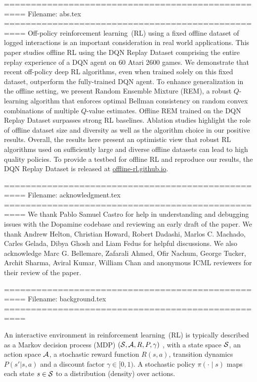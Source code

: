 
==================================================
Filename: abs.tex
==================================================
Off-policy reinforcement learning~(RL) using a fixed offline dataset
of logged interactions is an important consideration in real world
applications.
This paper studies offline RL using the DQN Replay Dataset
comprising the entire replay experience of a DQN agent on 60 Atari
2600 games.
We demonstrate that recent off-policy deep RL algorithms,
even when trained solely on this fixed dataset, outperform the fully-trained DQN agent.
To enhance generalization in the offline setting,
we present Random Ensemble Mixture (REM),
a robust $Q$-learning algorithm that enforces optimal Bellman consistency on
random convex combinations of multiple $Q$-value estimates.
Offline REM trained on the DQN Replay Dataset surpasses
strong RL baselines.  Ablation studies highlight the role of offline dataset size and diversity as well as the algorithm choice in  our positive results. Overall, the results here present an
optimistic view that robust RL algorithms used on sufficiently
large and diverse offline datasets can lead to high quality policies.
To provide a testbed for offline RL and reproduce our results, the DQN Replay Dataset is released at
\href{https://offline-rl.github.io}{offline-rl.github.io}.


==================================================
Filename: acknowledgment.tex
==================================================
We thank Pablo Samuel Castro for help in understanding and debugging issues with
the Dopamine codebase and reviewing an early draft of the paper. We thank Andrew Helton, 
Christian Howard, Robert Dadashi, Marlos C. Machado, Carles Gelada, Dibya Ghosh and Liam Fedus for helpful discussions. 
We also acknowledge
Marc G. Bellemare, Zafarali Ahmed, Ofir Nachum, George Tucker, Archit Sharma, Aviral Kumar,
William Chan and anonymous ICML reviewers for their review of the paper.


==================================================
Filename: background.tex
==================================================

An interactive environment in reinforcement learning~(RL) is typically described as a Markov
decision process (MDP) $(\mathcal{S}, \mathcal{A}, R,
P, \gamma)$ \citep{puterman1994markov}, with a state space $\mathcal{S}$, an
action space $\mathcal{A}$, a stochastic reward function $R(s, a)$,
transition dynamics $P(s' | s, a)$ and a discount factor $\gamma \in
[0, 1)$. A stochastic policy $\pi(\cdot\mid s)$ maps each state
$s \in \mathcal{S}$ to a distribution (density) over actions.

